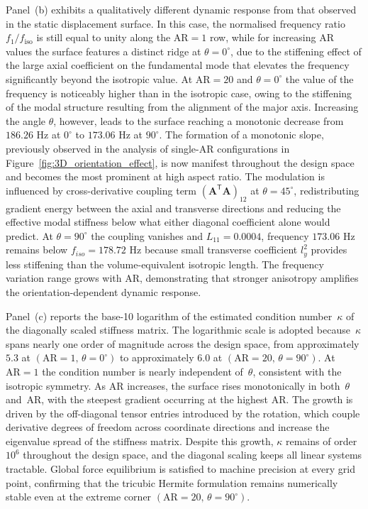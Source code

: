 \documentclass[final,3p,times,fleqn]{elsarticle}
\begin{document}
Panel~(b) exhibits a qualitatively different dynamic response from
that observed in the static displacement surface.
In this case, the normalised frequency ratio $f_{1}/f_{\mathrm{iso}}$
is still equal to unity along the $\mathrm{AR}=1$ row, while for
increasing $\mathrm{AR}$ values the surface features a distinct
ridge at $\theta = 0^{\circ}$, due to the stiffening effect of the
large axial coefficient on the fundamental mode that elevates the
frequency significantly beyond the isotropic value.
At $\mathrm{AR}=20$ and $\theta = 0^{\circ}$ the value of the
frequency is noticeably higher than in the isotropic case, owing to
the stiffening of the modal structure resulting from the alignment of the
major axis.
Increasing the angle $\theta$, however, leads to the surface reaching a
monotonic decrease from $186.26$ Hz at $0^{\circ}$ to $173.06$ Hz at $90^{\circ}$.
The formation of a monotonic slope, previously observed in the analysis of
single-$\mathrm{AR}$ configurations in Figure~\ref{fig:3D_orientation_effect},
is now manifest throughout the design space and becomes the most
prominent at high aspect ratio.
The modulation is influenced by cross-derivative coupling term $(\mathbf{A}^{\mathsf{T}}\mathbf{A})_{12}$ at
$\theta = 45^{\circ}$, redistributing gradient energy
between the axial and transverse directions and reducing the
effective modal stiffness below what either diagonal coefficient
alone would predict.
At $\theta=90^{\circ}$ the coupling vanishes and $L_{11}=0.0004$, frequency $173.06$ Hz remains below $f_{iso}=178.72$ Hz because small transverse coefficient $l_{y}^{2}$ provides less stiffening
than the volume-equivalent isotropic length.
The frequency variation range grows with AR,
demonstrating that stronger anisotropy amplifies the
orientation-dependent dynamic response.

Panel~(c) reports the base-10 logarithm of the estimated condition
number~$\kappa$ of the diagonally scaled stiffness matrix.
The logarithmic scale is adopted because~$\kappa$ spans nearly one
order of magnitude across the design space, from approximately
$5.3$ at $(\mathrm{AR}=1,\,\theta = 0^{\circ})$ to approximately
$6.0$ at $(\mathrm{AR}=20,\,\theta = 90^{\circ})$.
At $\mathrm{AR}=1$ the condition number is nearly independent
of~$\theta$, consistent with the isotropic symmetry.
As AR increases, the surface rises monotonically in both~$\theta$
and~AR, with the steepest gradient occurring at the highest AR.
The growth is driven by the off-diagonal tensor entries introduced
by the rotation, which couple derivative degrees of freedom across
coordinate directions and increase the eigenvalue spread of the
stiffness matrix.
Despite this growth, $\kappa$ remains of order~$10^{6}$ throughout
the design space, and the diagonal scaling keeps all linear systems
tractable.
Global force equilibrium is satisfied to machine precision at every
grid point, confirming that the tricubic Hermite formulation remains
numerically stable even at the extreme corner
$(\mathrm{AR}=20,\,\theta = 90^{\circ})$.
\end{document}
